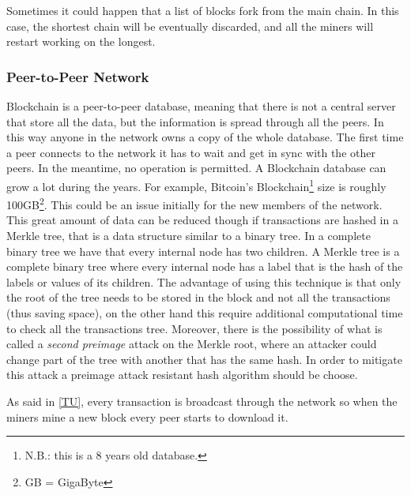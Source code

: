 \label{fork}
Sometimes it could happen that a list of blocks fork from the main chain. In
this case, the shortest chain will be eventually discarded, and all the miners
will restart working on the longest\cite{sok15}.

\subsubsection{Peer-to-Peer Network}

Blockchain is a peer-to-peer database, meaning that there is not a central
server that store all the data, but the information is spread through all the
peers.
In this way anyone in the network owns a copy of the whole database. The first
time a peer connects to the network it has to wait and get in sync with the
other peers. In the meantime, no operation is permitted. A Blockchain database
can grow a lot during the years. For example, Bitcoin's
Blockchain\footnote{N.B.: this is a 8 years old database.} size is roughly
100GB\footnote{GB = GigaByte}. This could be an issue initially for the new
members of the network.
This great amount of data can be reduced though if transactions are hashed in a
Merkle tree, that is a data structure similar to a binary tree. In a complete
binary tree we have that every internal node has two children. A Merkle tree is
a complete binary tree where every internal node has a label that is the hash
of the labels or values of its children\cite{szydlo04}. The advantage of using
this technique is that only the root of the tree needs to be stored in the
block and not all the transactions\cite{nakamoto08} (thus saving space), on the
other hand this require additional computational time to check all the
transactions tree. Moreover, there is the possibility of what is called a
\textit{second preimage} attack on the Merkle root, where an attacker could
change part of the tree with another that has the same hash\cite{rogaway04}. In
order to mitigate this attack a preimage attack resistant hash algorithm should
be choose.


As said in \ref{TU}, every transaction is broadcast through the network so when
the miners mine a new block every peer starts to download it.

